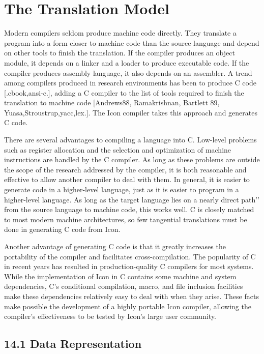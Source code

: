 \clearpage\chapter{The Translation Model}

Modern compilers seldom produce machine code directly. They translate
a program into a form closer to machine code than the source language
and depend on other tools to finish the translation. If the compiler
produces an object module, it depends on a linker and a loader to
produce executable code. If the compiler produces assembly language,
it also depends on an assembler. A trend among compilers
produced in research environments has been to produce C code
[.cbook,ansi-c.], adding a C compiler to the list of tools required to
finish the translation to machine code [Andrews88, Ramakrishnan, Bartlett
89, Yuasa,Stroustrup,yacc,lex.]. The Icon compiler takes this approach
and generates C code.


There are several advantages to compiling a language into C. Low-level
problems such as register allocation and the selection and
optimization of machine instructions are handled by the C compiler. As
long as these problems are outside the scope of the research addressed
by the compiler, it is both reasonable and effective to allow another
compiler to deal with them. In general, it is easier to generate code
in a higher-level language, just as it is easier to program in a
higher-level language. As long as the target language lies on a
{\textasciigrave}{\textasciigrave}nearly direct path'{}' from the
source language to machine code, this works well. C is closely matched
to most modern machine architectures, so few tangential translations
must be done in generating C code from Icon.


Another advantage of generating C code is that it greatly increases
the portability of the compiler and facilitates cross-compilation. The
popularity of C in recent years has resulted in production-quality C
compilers for most systems.  While the implementation of Icon in C
contains some machine and system dependencies, C's conditional
compilation, macro, and file inclusion facilities make these
dependencies relatively easy to deal with when they arise. These facts
make possible the development of a highly portable Icon compiler,
allowing the compiler's effectiveness to be tested by Icon's large
user community.

\section[14.1 Data Representation]{14.1 Data Representation}

